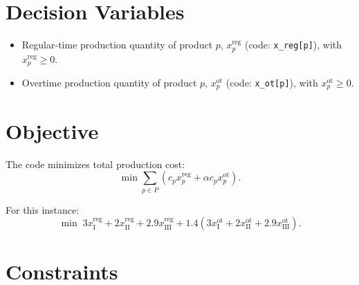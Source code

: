 \section*{Decision Variables}

\begin{itemize}
    \item Regular-time production quantity of product $p$, $x^{\mathrm{reg}}_p$ (code: \texttt{x\_reg[p]}), with $x^{\mathrm{reg}}_p \ge 0$.
    \item Overtime production quantity of product $p$, $x^{\mathrm{ot}}_p$ (code: \texttt{x\_ot[p]}), with $x^{\mathrm{ot}}_p \ge 0$.
\end{itemize}

\section*{Objective}

The code minimizes total production cost:
\[
\min \sum_{p \in P} \left(c_p x^{\mathrm{reg}}_p + \alpha c_p x^{\mathrm{ot}}_p\right).
\]

For this instance:
\[
\min\;
3x^{\mathrm{reg}}_{\mathrm{I}} + 2x^{\mathrm{reg}}_{\mathrm{II}} + 2.9x^{\mathrm{reg}}_{\mathrm{III}}
+ 1.4\left(3x^{\mathrm{ot}}_{\mathrm{I}} + 2x^{\mathrm{ot}}_{\mathrm{II}} + 2.9x^{\mathrm{ot}}_{\mathrm{III}}\right).
\]

\section*{Constraints}

